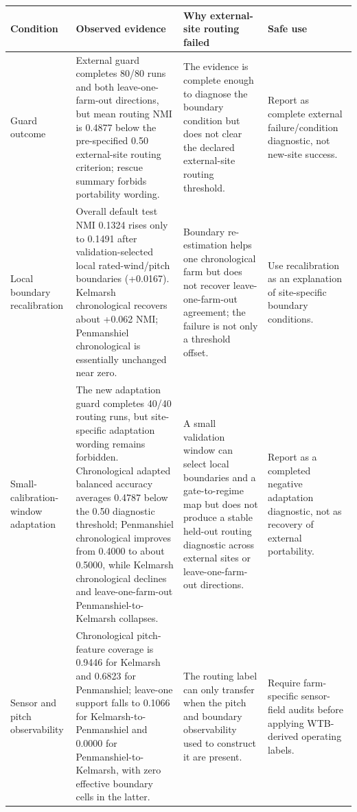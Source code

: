 \begin{tabularx}{0.98\textwidth}{>{\raggedright\arraybackslash}p{} >{\raggedright\arraybackslash}X >{\raggedright\arraybackslash}X >{\raggedright\arraybackslash}X}
\toprule
Condition & Observed evidence & Why external-site routing failed & Safe use \\
\midrule
Guard outcome & External guard completes 80/80 runs and both leave-one-farm-out directions, but mean routing NMI is 0.4877 below the pre-specified 0.50 external-site routing criterion; rescue summary forbids portability wording. & The evidence is complete enough to diagnose the boundary condition but does not clear the declared external-site routing threshold. & Report as complete external failure/condition diagnostic, not new-site success. \\
Local boundary recalibration & Overall default test NMI 0.1324 rises only to 0.1491 after validation-selected local rated-wind/pitch boundaries (+0.0167). Kelmarsh chronological recovers about +0.062 NMI; Penmanshiel chronological is essentially unchanged near zero. & Boundary re-estimation helps one chronological farm but does not recover leave-one-farm-out agreement; the failure is not only a threshold offset. & Use recalibration as an explanation of site-specific boundary conditions. \\
Small-calibration-window adaptation & The new adaptation guard completes 40/40 routing runs, but site-specific adaptation wording remains forbidden. Chronological adapted balanced accuracy averages 0.4787 below the 0.50 diagnostic threshold; Penmanshiel chronological improves from 0.4000 to about 0.5000, while Kelmarsh chronological declines and leave-one-farm-out Penmanshiel-to-Kelmarsh collapses. & A small validation window can select local boundaries and a gate-to-regime map but does not produce a stable held-out routing diagnostic across external sites or leave-one-farm-out directions. & Report as a completed negative adaptation diagnostic, not as recovery of external portability. \\
Sensor and pitch observability & Chronological pitch-feature coverage is 0.9446 for Kelmarsh and 0.6823 for Penmanshiel; leave-one support falls to 0.1066 for Kelmarsh-to-Penmanshiel and 0.0000 for Penmanshiel-to-Kelmarsh, with zero effective boundary cells in the latter. & The routing label can only transfer when the pitch and boundary observability used to construct it are present. & Require farm-specific sensor-field audits before applying WTB-derived operating labels. \\

\end{tabularx}
